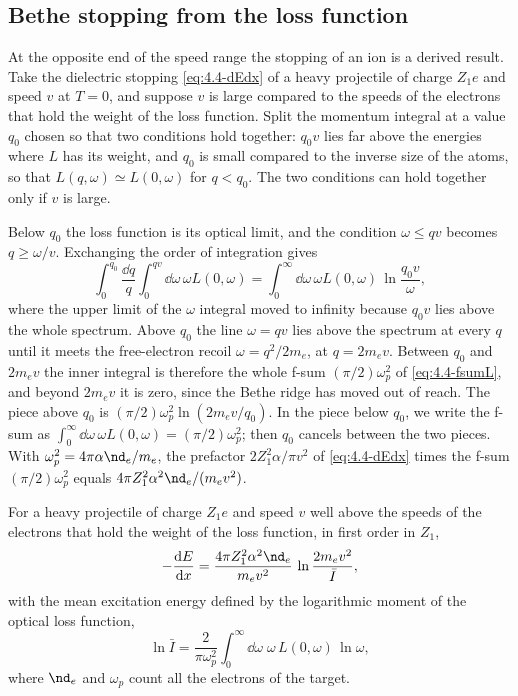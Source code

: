 \subsection{Bethe stopping from the loss function}\label{sec:19.3-bethe}

At the opposite end of the speed range the stopping of an ion is a derived result. Take the dielectric stopping \cref{eq:4.4-dEdx} of a heavy projectile of charge $Z_1e$ and speed $v$ at $T = 0$, and suppose $v$ is large compared to the speeds of the electrons that hold the weight of the loss function. Split the momentum integral at a value $q_0$ chosen so that two conditions hold together: $q_0v$ lies far above the energies where $L$ has its weight, and $q_0$ is small compared to the inverse size of the atoms, so that $L(q,\omega) \simeq L(0,\omega)$ for $q < q_0$. The two conditions can hold together only if $v$ is large.

Below $q_0$ the loss function is its optical limit, and the condition $\omega \le qv$ becomes $q \ge \omega/v$. Exchanging the order of integration gives
\begin{equation*}
  \int_0^{q_0}\frac{\dd q}{q}\int_0^{qv}\dd\omega\,\omega L(0,\omega) = \int_0^\infty\dd\omega\,\omega L(0,\omega)\,\ln\frac{q_0v}{\omega} ,
\end{equation*}
where the upper limit of the $\omega$ integral moved to infinity because $q_0v$ lies above the whole spectrum. Above $q_0$ the line $\omega = qv$ lies above the spectrum at every $q$ until it meets the free-electron recoil $\omega = q^2/2m_e$, at $q = 2m_ev$. Between $q_0$ and $2m_ev$ the inner integral is therefore the whole f-sum $(\pi/2)\omega_p^2$ of \cref{eq:4.4-fsumL}, and beyond $2m_ev$ it is zero, since the Bethe ridge has moved out of reach. The piece above $q_0$ is $(\pi/2)\omega_p^2\ln(2m_ev/q_0)$. In the piece below $q_0$, we write the f-sum as $\int_0^\infty\dd\omega\,\omega L(0,\omega) = (\pi/2)\omega_p^2$; then $q_0$ cancels between the two pieces. With $\omega_p^2 = 4\pi\alpha\nd_e/m_e$, the prefactor $2Z_1^2\alpha/\pi v^2$ of \cref{eq:4.4-dEdx} times the f-sum $(\pi/2)\omega_p^2$ equals $4\pi Z_1^2\alpha^2\nd_e/(m_ev^2)$.

\begin{keyresult}
For a heavy projectile of charge $Z_1e$ and speed $v$ well above the speeds of the electrons that hold the weight of the loss function, in first order in $Z_1$,
\begin{equation}
  -\frac{\dd E}{\dd x} = \frac{4\pi Z_1^2\alpha^2\nd_e}{m_ev^2}\,\ln\frac{2m_ev^2}{\bar I} ,
  \label{eq:19.3-bethe}
\end{equation}
with the mean excitation energy defined by the logarithmic moment of the optical loss function,
\begin{equation}
  \ln\bar I = \frac{2}{\pi\omega_p^2}\int_0^\infty\dd\omega\;\omega\,L(0,\omega)\,\ln\omega ,
  \label{eq:19.3-lnI}
\end{equation}
where $\nd_e$ and $\omega_p$ count all the electrons of the target.
\end{keyresult}

